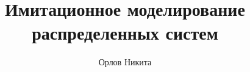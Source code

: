\documentclass[a4paper,14pt]{article}
\begin{document}
    \author{Орлов Никита}
    \title{Имитационное моделирование распределенных систем}
    \maketitle

    

    \printbibliography
\end{document}
